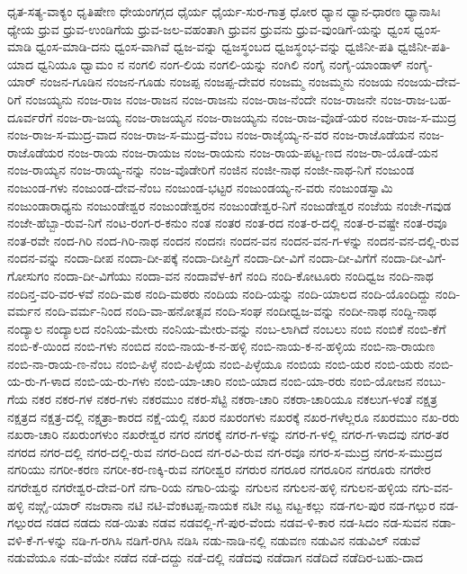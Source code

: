 ಧೃತ-ಸತ್ಯ-ವಾಕ್ಯಂ
ಧೃತಿಷೇಣ
ಧೇಯಂಗಗ್ಗದ
ಧೈರ್ಯ
ಧೈರ್ಯ-ಸುರ-ಗಾತ್ರ
ಧೋರ
ಧ್ಯಾನ
ಧ್ಯಾನ-ಧಾರಣ
ಧ್ಯಾನಾಸಿಃ
ಧ್ಯೇಯ
ಧ್ರುವ
ಧ್ರುವ-ಉಂಡಿಗೆಯ
ಧ್ರುವ-ಜಲ-ವಹಂತಾಗಿ
ಧ್ರುವನ
ಧ್ರುವನು
ಧ್ರುವ-ವುಂಡಿಗೆ-ಯನ್ನು
ಧ್ವಂಸ
ಧ್ವಂಸ-ಮಾಡಿ
ಧ್ವಂಸ-ಮಾಡಿ-ದನು
ಧ್ವಂಸ-ವಾಗಿವೆ
ಧ್ವಜ-ವನ್ನು
ಧ್ವಜಸ್ಥಂಬದ
ಧ್ವಜಸ್ಥಂಭ-ವನ್ನು
ಧ್ವಜಿನೀ-ಪತಿ
ಧ್ವಜಿನೀ-ಪತಿ-ಯಾದ
ಧ್ವನಿಯೂ
ಧ್ವಾಮಂ
ನ
ನಂಗಲಿ
ನಂಗ-ಲಿಯ
ನಂಗಲಿ-ಯನ್ನು
ನಂಗಿಲಿ
ನಂಗೈ
ನಂಗೈ-ಯಾಂಡಾಳ್
ನಂಗೈ-ಯಾರ್
ನಂಜನ-ಗೂಡಿನ
ನಂಜನ-ಗೂಡು
ನಂಜಪ್ಪ
ನಂಜಪ್ಪ-ದೇವರ
ನಂಜಮ್ಮ
ನಂಜಮ್ಮನು
ನಂಜಯ
ನಂಜಯ-ದೇವ-ರಿಗೆ
ನಂಜಯ್ಯನು
ನಂಜ-ರಾಜ
ನಂಜ-ರಾಜನ
ನಂಜ-ರಾಜನು
ನಂಜ-ರಾಜ-ನೆಂದೇ
ನಂಜ-ರಾಜನೇ
ನಂಜ-ರಾಜ-ಬಹ-ದೂರ್ವರೆಗೆ
ನಂಜ-ರಾ-ಜಯ್ಯ
ನಂಜ-ರಾಜಯ್ಯನ
ನಂಜ-ರಾಜಯ್ಯನು
ನಂಜ-ರಾಜ-ವೊಡೆ-ಯರ
ನಂಜ-ರಾಜ-ಸ-ಮುದ್ರ
ನಂಜ-ರಾಜ-ಸ-ಮುದ್ರ-ವಾದ
ನಂಜ-ರಾಜ-ಸ-ಮುದ್ರ-ವೆಂಬ
ನಂಜ-ರಾಜೈಯ್ಯ-ನ-ವರ
ನಂಜ-ರಾಜೊಡೆಯನ
ನಂಜ-ರಾಜೊಡೆಯರ
ನಂಜ-ರಾಯ
ನಂಜ-ರಾಯಜ
ನಂಜ-ರಾಯನು
ನಂಜ-ರಾಯ-ಪಟ್ಟ-ಣದ
ನಂಜ-ರಾ-ಯೊಡೆ-ಯನ
ನಂಜ-ರಾಯ್ಯನ
ನಂಜ-ರಾಯ್ಯ-ನನ್ನು
ನಂಜ-ವೊಡೇರಿಗೆ
ನಂಜಿನ
ನಂಜೀ-ನಾಥ
ನಂಜೀ-ನಾಥ-ನಿಗೆ
ನಂಜುಂಡ
ನಂಜುಂಡ-ಗಳು
ನಂಜುಂಡ-ದೇವ-ನೆಂಬ
ನಂಜುಂಡ-ಭಟ್ಟರ
ನಂಜುಂಡಯ್ಯ-ನ-ವರು
ನಂಜುಂಡಸ್ವಾಮಿ
ನಂಜುಂಡಾರಾಧ್ಯನು
ನಂಜುಂಡೇಶ್ವರ
ನಂಜುಂಡೇಶ್ವರನ
ನಂಜುಂಡೇಶ್ವರ-ನಿಗೆ
ನಂಜುಡೇಶ್ವರ
ನಂಜೆಯ
ನಂಜೇ-ಗವುಡ
ನಂಜೇ-ಹೆಬ್ಬಾ-ರುವ-ನಿಗೆ
ನಂಟ-ರಂಗ-ರ-ಕನುಂ
ನಂತ
ನಂತರ
ನಂತ-ರದ
ನಂತ-ರ-ದಲ್ಲಿ
ನಂತ-ರ-ವಷ್ಟೇ
ನಂತ-ರವೂ
ನಂತ-ರವೇ
ನಂದ-ಗಿರಿ
ನಂದ-ಗಿರಿ-ನಾಥ
ನಂದನ
ನಂದನಃ
ನಂದನ-ವನ
ನಂದನ-ವನ-ಗ-ಳನ್ನು
ನಂದನ-ವನ-ದಲ್ಲಿ-ರುವ
ನಂದನ-ವನ್ನು
ನಂದಾ-ದೀಪ
ನಂದಾ-ದೀ-ಪಕ್ಕೆ
ನಂದಾ-ದೀಪ್ತಿಗೆ
ನಂದಾ-ದೀ-ವಿಗೆ
ನಂದಾ-ದೀ-ವಿಗೆಗೆ
ನಂದಾ-ದೀ-ವಿಗೆ-ಗೋಸುಗಂ
ನಂದಾ-ದೀ-ವಿಗೆಯು
ನಂದಾ-ವನ
ನಂದಾವೆಳ-ಕಿಗೆ
ನಂದಿ
ನಂದಿ-ಕೋಟೂರು
ನಂದಿಧ್ವಜ
ನಂದಿ-ನಾಥ
ನಂದಿನ್ತ-ವರಿ-ವರ-ಳವೆ
ನಂದಿ-ಮಠ
ನಂದಿ-ಮಠರು
ನಂದಿಯ
ನಂದಿ-ಯನ್ನು
ನಂದಿ-ಯಾಲದ
ನಂದಿ-ಯೊಂದಿದ್ದು
ನಂದಿ-ವರ್ಮನ
ನಂದಿ-ವರ್ಮ-ನಿಂದ
ನಂದಿ-ವಾ-ಹನೋತ್ಸವ
ನಂದಿ-ಸಂಘ
ನಂದೀಧ್ವಜ-ವನ್ನು
ನಂದೀ-ನಾಥ
ನಂದ್ದಿ-ನಾಥ
ನಂದ್ಯಾಲ
ನಂದ್ಯಾಲದ
ನಂನಿಯ-ಮೇರು
ನಂನಿಯ-ಮೇರು-ವನ್ನು
ನಂಬ-ಲಾಗಿದೆ
ನಂಬಲು
ನಂಬಿ
ನಂಬಿಕೆ
ನಂಬಿ-ಕೆಗೆ
ನಂಬಿ-ಕೆ-ಯಿಂದ
ನಂಬಿ-ಗಳು
ನಂಬಿದ
ನಂಬಿ-ನಾಯ-ಕ-ನ-ಹಳ್ಳಿ
ನಂಬಿ-ನಾಯ-ಕ-ನ-ಹಳ್ಳಿಯ
ನಂಬಿ-ನಾ-ರಾಯಣ
ನಂಬಿ-ನಾ-ರಾಯ-ಣ-ನೆಂಬ
ನಂಬಿ-ಪಿಳ್ಳೆ
ನಂಬಿ-ಪಿಳ್ಳೆಯ
ನಂಬಿ-ಪಿಳ್ಳೆಯೂ
ನಂಬಿಯ
ನಂಬಿ-ಯರ
ನಂಬಿ-ಯರು
ನಂಬಿ-ಯ-ರು-ಗ-ಳಾದ
ನಂಬಿ-ಯ-ರು-ಗಳು
ನಂಬಿ-ಯಾ-ಚಾರಿ
ನಂಬಿ-ಯಾದ
ನಂಬಿ-ಯಾ-ರರು
ನಂಬಿ-ಯೋಜನ
ನಂಬು-ಗೆಯ
ನಕರ
ನಕರ-ಗಳ
ನಕರ-ಗಳು
ನಕರಮುಂ
ನಕರ-ಸೆಟ್ಟಿ
ನಕರಾ-ಚಾರಿ
ನಕರಾ-ಚಾರಿಯೂ
ನಕಲುಗ-ಳಂತೆ
ನಕ್ಷತ್ರ
ನಕ್ಷತ್ರದ
ನಕ್ಷತ್ರ-ದಲ್ಲಿ
ನಕ್ಷತ್ರಾ-ಕಾರದ
ನಕ್ಷೆ-ಯಲ್ಲಿ
ನಖರ
ನಖರಂಗಳು
ನಖರಕ್ಕೆ
ನಖರ-ಗಳೆಲ್ಲರೂ
ನಖರಮುಂ
ನಖ-ರರು
ನಖರಾ-ಚಾರಿ
ನಖರುಂಗಳುಂ
ನಖರೇಶ್ವರ
ನಗರ
ನಗರಕ್ಕೆ
ನಗರ-ಗ-ಳನ್ನು
ನಗರ-ಗ-ಳಲ್ಲಿ
ನಗರ-ಗ-ಳಾದವು
ನಗರ-ತರ
ನಗರದ
ನಗರ-ದಲ್ಲಿ
ನಗರ-ದಲ್ಲಿ-ರುವ
ನಗರ-ದಿಂದ
ನಗ-ರವಿ-ರುವ
ನಗ-ರವೂ
ನಗರ-ಸ-ಮುದ್ರ
ನಗರ-ಸ-ಮುದ್ರದ
ನಗರಿಯು
ನಗರೀ-ಕರಣ
ನಗರೀ-ಕರ-ಣಕ್ಕಿ-ರುವ
ನಗರೀಶ್ವರ
ನಗರುರ
ನಗರೂರ
ನಗರೂರಿನ
ನಗರೂರು
ನಗರೇರ
ನಗರೇಶ್ವರ
ನಗರೇಶ್ವರ-ದೇವ-ರಿಗೆ
ನಗಾ-ರಿಯ
ನಗಾರಿ-ಯನ್ನು
ನಗುಲನ
ನಗುಲನ-ಹಳ್ಳಿ
ನಗುಲನ-ಹಳ್ಳಿಯ
ನಗು-ವನ-ಹಳ್ಳಿ
ನಙ್ಗೈ-ಯಾರ್
ನಜರಾನಾ
ನಟಿ
ನಟಿ-ವೆಂಕಟಪ್ಪ-ನಾಯಕ
ನಟೀ
ನಟ್ಟ
ನಟ್ಟ-ಕಲ್ಲು
ನಡ-ಗಲ-ಪುರ
ನಡ-ಗಲ್ಪುರ
ನಡ-ಗಲ್ಪುರದ
ನಡದ
ನಡದು
ನಡ-ಯಿತು
ನಡವ
ನಡವಲ್ಲಿ-ಗೆ-ಪುರ-ವೆಂದು
ನಡವ-ಳಿ-ಕಾರ
ನಡ-ಸಿದಂ
ನಡ-ಸುವನ
ನಡಾ-ವಳಿ-ಕೆ-ಗ-ಳನ್ನು
ನಡಿ-ಗ-ರಗಿಸಿ
ನಡಿಗೆ-ರಗಿಸಿ
ನಡಿಸಿ
ನಡು-ನಾಡಿ-ನಲ್ಲಿ
ನಡುವಣ
ನಡುವಿನ
ನಡುವಿಲ್
ನಡುವೆ
ನಡುವೆಯೂ
ನಡು-ವೆಯೇ
ನಡೆದ
ನಡೆ-ದದ್ದು
ನಡೆ-ದಲ್ಲಿ
ನಡೆದವು
ನಡೆದಾಗ
ನಡೆದಿದೆ
ನಡೆದಿರ-ಬಹು-ದಾದ
